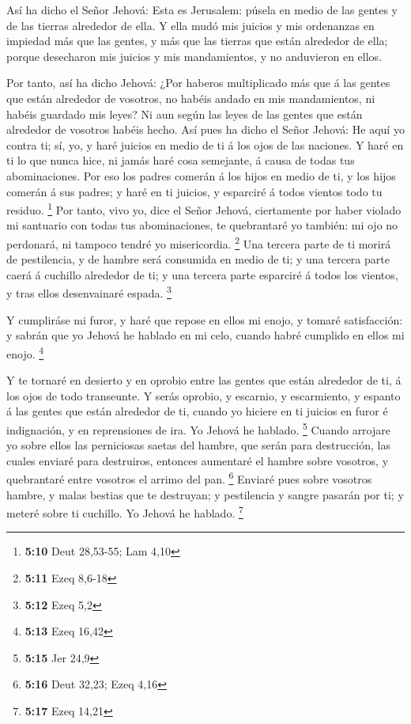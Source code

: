  Así ha dicho el Señor Jehová: Esta es Jerusalem: púsela
en medio de las gentes y de las tierras alrededor de ella.
 Y ella mudó mis juicios y mis ordenanzas en impiedad más
que las gentes, y más que las tierras que están alrededor de ella;
porque desecharon mis juicios y mis mandamientos, y no anduvieron en
ellos.

 Por tanto, así ha dicho Jehová: ¿Por haberos multiplicado
más que á las gentes que están alrededor de vosotros, no habéis andado
en mis mandamientos, ni habéis guardado mis leyes? Ni aun según las
leyes de las gentes que están alrededor de vosotros habéis hecho.
 Así pues ha dicho el Señor Jehová: He aquí yo contra ti;
sí, yo, y haré juicios en medio de ti á los ojos de las naciones.
 Y haré en ti lo que nunca hice, ni jamás haré cosa
semejante, á causa de todas tus abominaciones.  Por eso
los padres comerán á los hijos en medio de ti, y los hijos comerán á sus
padres; y haré en ti juicios, y esparciré á todos vientos todo tu
residuo. \footnote{\textbf{5:10} Deut 28,53-55; Lam 4,10}
 Por tanto, vivo yo, dice el Señor Jehová, ciertamente
por haber violado mi santuario con todas tus abominaciones, te
quebrantaré yo también: mi ojo no perdonará, ni tampoco tendré yo
misericordia. \footnote{\textbf{5:11} Ezeq 8,6-18}  Una
tercera parte de ti morirá de pestilencia, y de hambre será consumida en
medio de ti; y una tercera parte caerá á cuchillo alrededor de ti; y una
tercera parte esparciré á todos los vientos, y tras ellos desenvainaré
espada. \footnote{\textbf{5:12} Ezeq 5,2}

 Y cumpliráse mi furor, y haré que repose en ellos mi
enojo, y tomaré satisfacción: y sabrán que yo Jehová he hablado en mi
celo, cuando habré cumplido en ellos mi enojo. \footnote{\textbf{5:13}
  Ezeq 16,42}

 Y te tornaré en desierto y en oprobio entre las gentes
que están alrededor de ti, á los ojos de todo transeunte.
 Y serás oprobio, y escarnio, y escarmiento, y espanto á
las gentes que están alrededor de ti, cuando yo hiciere en ti juicios en
furor é indignación, y en reprensiones de ira. Yo Jehová he hablado.
\footnote{\textbf{5:15} Jer 24,9}  Cuando arrojare yo
sobre ellos las perniciosas saetas del hambre, que serán para
destrucción, las cuales enviaré para destruiros, entonces aumentaré el
hambre sobre vosotros, y quebrantaré entre vosotros el arrimo del pan.
\footnote{\textbf{5:16} Deut 32,23; Ezeq 4,16}  Enviaré
pues sobre vosotros hambre, y malas bestias que te destruyan; y
pestilencia y sangre pasarán por ti; y meteré sobre ti cuchillo. Yo
Jehová he hablado. \footnote{\textbf{5:17} Ezeq 14,21}

